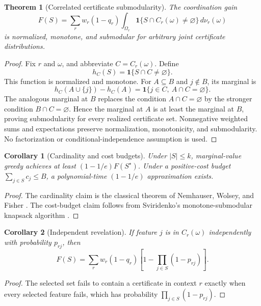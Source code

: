 \documentclass[11pt]{article}
\newtheorem{theorem}{Theorem}
\newtheorem{corollary}{Corollary}
\newcommand{\ind}{\mathbf{1}}
\begin{document}
\begin{theorem}[Correlated certificate submodularity]\label{thm:cert-supp}
The coordination gain
\[
F(S)=\sum_r w_r(1-q_r)
\int_{\Omega_r}\ind\{S\cap C_r(\omega)\ne\varnothing\}\,d\nu_r(\omega)
\]
is normalized, monotone, and submodular for arbitrary joint certificate distributions.
\end{theorem}
\begin{proof}
Fix $r$ and $\omega$, and abbreviate $C=C_r(\omega)$. Define
\[
h_C(S)=\ind\{S\cap C\ne\varnothing\}.
\]
This function is normalized and monotone. For $A\subseteq B$ and $j\notin B$, its marginal is
\[
h_C(A\cup\{j\})-h_C(A)
=\ind\{j\in C,\ A\cap C=\varnothing\}.
\]
The analogous marginal at $B$ replaces the condition $A\cap C=\varnothing$ by the stronger condition $B\cap C=\varnothing$. Hence the marginal at $A$ is at least the marginal at $B$, proving submodularity for every realized certificate set. Nonnegative weighted sums and expectations preserve normalization, monotonicity, and submodularity. No factorization or conditional-independence assumption is used.
\end{proof}

\begin{corollary}[Cardinality and cost budgets]\label{cor:budgets}
Under $|S|\le k$, marginal-value greedy achieves at least $(1-1/e)F(S^\star)$. Under a positive-cost budget $\sum_{j\in S}c_j\le B$, a polynomial-time $(1-1/e)$ approximation exists.
\end{corollary}
\begin{proof}
The cardinality claim is the classical theorem of Nemhauser, Wolsey, and Fisher \cite{NemhauserEtAl1978}. The cost-budget claim follows from Sviridenko's monotone-submodular knapsack algorithm \cite{Sviridenko2004}.
\end{proof}

\begin{corollary}[Independent revelation]\label{cor:independent}
If feature $j$ is in $C_r(\omega)$ independently with probability $p_{rj}$, then
\[
F(S)=\sum_r w_r(1-q_r)\left[1-\prod_{j\in S}(1-p_{rj})\right].
\]
\end{corollary}
\begin{proof}
The selected set fails to contain a certificate in context $r$ exactly when every selected feature fails, which has probability $\prod_{j\in S}(1-p_{rj})$.
\end{proof}
\end{document}
